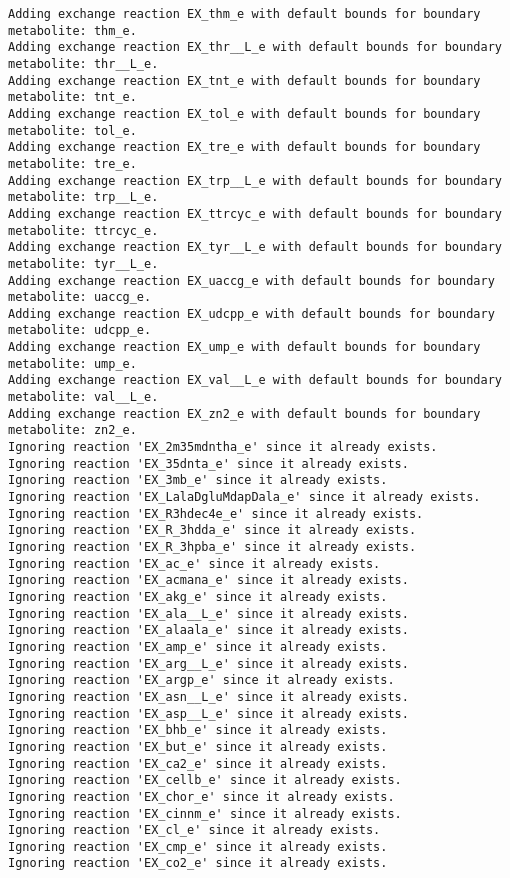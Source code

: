 \documentclass[
  letterpaper,
  DIV=11,
  numbers=noendperiod]{scrartcl}
\begin{document}
\begin{verbatim}
Adding exchange reaction EX_thm_e with default bounds for boundary metabolite: thm_e.
Adding exchange reaction EX_thr__L_e with default bounds for boundary metabolite: thr__L_e.
Adding exchange reaction EX_tnt_e with default bounds for boundary metabolite: tnt_e.
Adding exchange reaction EX_tol_e with default bounds for boundary metabolite: tol_e.
Adding exchange reaction EX_tre_e with default bounds for boundary metabolite: tre_e.
Adding exchange reaction EX_trp__L_e with default bounds for boundary metabolite: trp__L_e.
Adding exchange reaction EX_ttrcyc_e with default bounds for boundary metabolite: ttrcyc_e.
Adding exchange reaction EX_tyr__L_e with default bounds for boundary metabolite: tyr__L_e.
Adding exchange reaction EX_uaccg_e with default bounds for boundary metabolite: uaccg_e.
Adding exchange reaction EX_udcpp_e with default bounds for boundary metabolite: udcpp_e.
Adding exchange reaction EX_ump_e with default bounds for boundary metabolite: ump_e.
Adding exchange reaction EX_val__L_e with default bounds for boundary metabolite: val__L_e.
Adding exchange reaction EX_zn2_e with default bounds for boundary metabolite: zn2_e.
Ignoring reaction 'EX_2m35mdntha_e' since it already exists.
Ignoring reaction 'EX_35dnta_e' since it already exists.
Ignoring reaction 'EX_3mb_e' since it already exists.
Ignoring reaction 'EX_LalaDgluMdapDala_e' since it already exists.
Ignoring reaction 'EX_R3hdec4e_e' since it already exists.
Ignoring reaction 'EX_R_3hdda_e' since it already exists.
Ignoring reaction 'EX_R_3hpba_e' since it already exists.
Ignoring reaction 'EX_ac_e' since it already exists.
Ignoring reaction 'EX_acmana_e' since it already exists.
Ignoring reaction 'EX_akg_e' since it already exists.
Ignoring reaction 'EX_ala__L_e' since it already exists.
Ignoring reaction 'EX_alaala_e' since it already exists.
Ignoring reaction 'EX_amp_e' since it already exists.
Ignoring reaction 'EX_arg__L_e' since it already exists.
Ignoring reaction 'EX_argp_e' since it already exists.
Ignoring reaction 'EX_asn__L_e' since it already exists.
Ignoring reaction 'EX_asp__L_e' since it already exists.
Ignoring reaction 'EX_bhb_e' since it already exists.
Ignoring reaction 'EX_but_e' since it already exists.
Ignoring reaction 'EX_ca2_e' since it already exists.
Ignoring reaction 'EX_cellb_e' since it already exists.
Ignoring reaction 'EX_chor_e' since it already exists.
Ignoring reaction 'EX_cinnm_e' since it already exists.
Ignoring reaction 'EX_cl_e' since it already exists.
Ignoring reaction 'EX_cmp_e' since it already exists.
Ignoring reaction 'EX_co2_e' since it already exists.

\end{verbatim}
\end{document}
